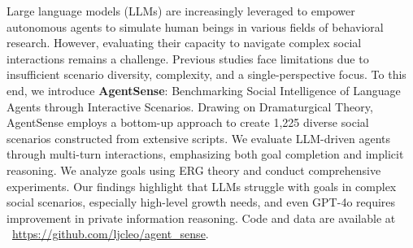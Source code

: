 Large language models (LLMs) are increasingly leveraged to empower autonomous agents to simulate human beings in various fields of behavioral research.
However, evaluating their capacity to navigate complex social interactions remains a challenge.
Previous studies face limitations due to insufficient scenario diversity, complexity, and a single-perspective focus.
To this end, we introduce \textbf{AgentSense}: Benchmarking Social Intelligence of Language Agents through Interactive Scenarios.
Drawing on Dramaturgical Theory, AgentSense employs a bottom-up approach to create 1,225 diverse social scenarios constructed from extensive scripts.
We evaluate LLM-driven agents through multi-turn interactions, emphasizing both goal completion and implicit reasoning.
We analyze goals using ERG theory and conduct comprehensive experiments.
Our findings highlight that LLMs struggle with goals in complex social scenarios, especially high-level growth needs, and even GPT-4o requires improvement in private information reasoning. Code and data are available at ~\url{https://github.com/ljcleo/agent_sense}.